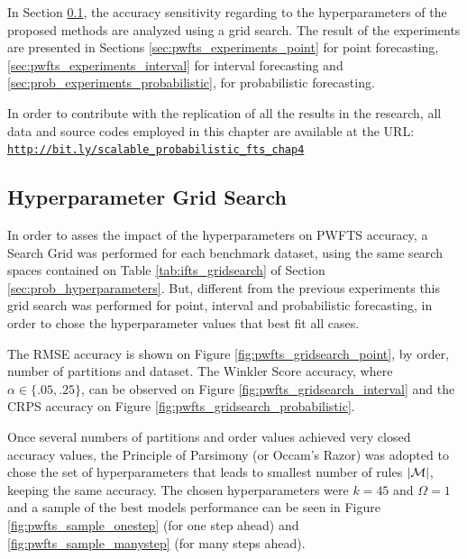 In Section \ref{sec:pwfts_hyperparameters}, the accuracy sensitivity regarding to the hyperparameters of the proposed methods are analyzed using a grid search. The result of the experiments are presented in Sections \ref{sec:pwfts_experiments_point} for point forecasting, \ref{sec:pwfts_experiments_interval} for interval forecasting  and  \ref{sec:prob_experiments_probabilistic}, for probabilistic forecasting.

In order to contribute with the replication of all the results in the research, all data and source codes employed in this chapter are available at the URL:
\texttt{\url{http://bit.ly/scalable_probabilistic_fts_chap4}}

\subsection{Hyperparameter Grid Search}
\label{sec:pwfts_hyperparameters}

In order to asses the impact of the hyperparameters on PWFTS accuracy, a Search Grid was performed for each benchmark dataset, using the same search spaces contained on Table \ref{tab:ifts_gridsearch} of Section \ref{sec:prob_hyperparameters}. But, different from the previous experiments this grid search was performed for point, interval and probabilistic forecasting, in order to chose the hyperparameter values that best fit all cases.

The RMSE accuracy is shown on Figure \ref{fig:pwfts_gridsearch_point}, by order, number of partitions and dataset. The Winkler Score accuracy, where  $\alpha \in \{.05,.25\}$, can be observed on Figure \ref{fig:pwfts_gridsearch_interval} and the CRPS accuracy on Figure \ref{fig:pwfts_gridsearch_probabilistic}.

Once several numbers of partitions and order values achieved very closed accuracy values, the Principle of Parsimony (or Occam's Razor) was adopted to chose the set of hyperparameters that leads to smallest number of rules $|\mathcal{M}|$, keeping the same accuracy. The chosen hyperparameters were $k = 45$ and $\Omega = 1$ and a sample of the best models performance can be seen in Figure \ref{fig:pwfts_sample_onestep} (for one step ahead) and \ref{fig:pwfts_sample_manystep} (for many steps ahead).


